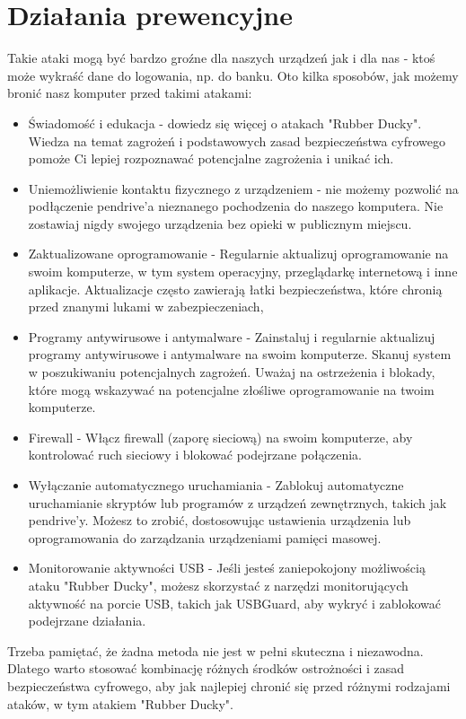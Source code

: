\documentclass{article}
\begin{document}
\section{Działania prewencyjne}

Takie ataki mogą być bardzo groźne dla naszych urządzeń jak i dla nas - ktoś może wykraść dane do logowania, np. do banku.
Oto kilka sposobów, jak możemy bronić nasz komputer przed takimi atakami:
\begin{itemize}
    \item Świadomość i edukacja - dowiedz się więcej o atakach "Rubber Ducky". Wiedza na temat zagrożeń i podstawowych zasad bezpieczeństwa cyfrowego pomoże Ci lepiej rozpoznawać potencjalne zagrożenia i unikać ich.
    \item Uniemożliwienie kontaktu fizycznego z urządzeniem - nie możemy pozwolić na podłączenie pendrive'a nieznanego pochodzenia do naszego komputera. Nie zostawiaj nigdy swojego urządzenia bez opieki w publicznym miejscu.
    \item Zaktualizowane oprogramowanie - Regularnie aktualizuj oprogramowanie na swoim komputerze, w tym system operacyjny, przeglądarkę internetową i inne aplikacje. Aktualizacje często zawierają łatki bezpieczeństwa, które chronią przed znanymi lukami w zabezpieczeniach,
    \item Programy antywirusowe i antymalware - Zainstaluj i regularnie aktualizuj programy antywirusowe i antymalware na swoim komputerze. Skanuj system w poszukiwaniu potencjalnych zagrożeń. Uważaj na ostrzeżenia i blokady, które mogą wskazywać na potencjalne złośliwe oprogramowanie na twoim komputerze.
    \item Firewall - Włącz firewall (zaporę sieciową) na swoim komputerze, aby kontrolować ruch sieciowy i blokować podejrzane połączenia.
    \item Wyłączanie automatycznego uruchamiania - Zablokuj automatyczne uruchamianie skryptów lub programów z urządzeń zewnętrznych, takich jak pendrive'y. Możesz to zrobić, dostosowując ustawienia urządzenia lub oprogramowania do zarządzania urządzeniami pamięci masowej.
    \item Monitorowanie aktywności USB - Jeśli jesteś zaniepokojony możliwością ataku "Rubber Ducky", możesz skorzystać z narzędzi monitorujących aktywność na porcie USB, takich jak USBGuard, aby wykryć i zablokować podejrzane działania.
\end{itemize}

Trzeba pamiętać, że żadna metoda nie jest w pełni skuteczna i niezawodna. Dlatego warto stosować kombinację różnych środków ostrożności i zasad bezpieczeństwa cyfrowego, aby jak najlepiej chronić się przed różnymi rodzajami ataków, w tym atakiem "Rubber Ducky".
\end{document}
